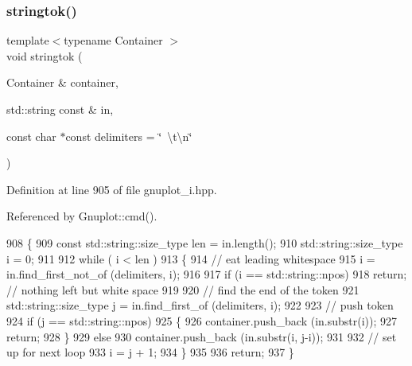 \subsubsection{stringtok()}
{\footnotesize\ttfamily template$<$typename Container $>$ \\
void stringtok (\begin{DoxyParamCaption}\item[{Container \&}]{container,  }\item[{std\+::string const \&}]{in,  }\item[{const char $\ast$const}]{delimiters = {\ttfamily \char`\"{}~\textbackslash{}t\textbackslash{}n\char`\"{}} }\end{DoxyParamCaption})}



Definition at line 905 of file gnuplot\+\_\+i.\+hpp.



Referenced by Gnuplot\+::cmd().


\begin{DoxyCode}
908 \{
909     \textcolor{keyword}{const} std::string::size\_type len = in.length();
910           std::string::size\_type i = 0;
911 
912     \textcolor{keywordflow}{while} ( i < len )
913     \{
914         \textcolor{comment}{// eat leading whitespace}
915         i = in.find\_first\_not\_of (delimiters, i);
916 
917         \textcolor{keywordflow}{if} (i == std::string::npos)
918             \textcolor{keywordflow}{return};   \textcolor{comment}{// nothing left but white space}
919 
920         \textcolor{comment}{// find the end of the token}
921         std::string::size\_type j = in.find\_first\_of (delimiters, i);
922 
923         \textcolor{comment}{// push token}
924         \textcolor{keywordflow}{if} (j == std::string::npos)
925         \{
926             container.push\_back (in.substr(i));
927             \textcolor{keywordflow}{return};
928         \}
929         \textcolor{keywordflow}{else}
930             container.push\_back (in.substr(i, j-i));
931 
932         \textcolor{comment}{// set up for next loop}
933         i = j + 1;
934     \}
935 
936     \textcolor{keywordflow}{return};
937 \}
\end{DoxyCode}
